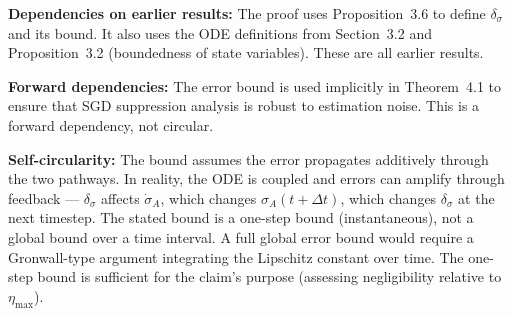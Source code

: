 \begin{circularity-check}
\textbf{Dependencies on earlier results:} The proof uses
Proposition~3.6 to define $\delta_\sigma$ and its bound. It also
uses the ODE definitions from Section~3.2 and Proposition~3.2
(boundedness of state variables). These are all earlier results.

\textbf{Forward dependencies:} The error bound is used implicitly
in Theorem~4.1 to ensure that SGD suppression analysis is robust
to estimation noise. This is a forward dependency, not circular.

\textbf{Self-circularity:} The bound assumes the error propagates
additively through the two pathways. In reality, the ODE is coupled
and errors can amplify through feedback — $\delta_\sigma$ affects
$\dot{\sigma}_A$, which changes $\sigma_A(t + \Delta t)$, which
changes $\delta_\sigma$ at the next timestep. The stated bound is a
one-step bound (instantaneous), not a global bound over a time
interval. A full global error bound would require a Gronwall-type
argument integrating the Lipschitz constant over time. The
one-step bound is sufficient for the claim's purpose (assessing
negligibility relative to $\eta_{\max}$).
\end{circularity-check}
